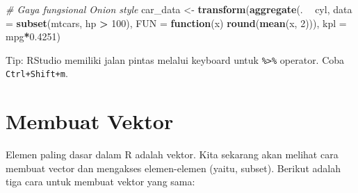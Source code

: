 \documentclass[
]{book}
\newenvironment{Shaded}{\begin{snugshade}}{\end{snugshade}}
\newcommand{\CommentTok}[1]{\textcolor[rgb]{0.56,0.35,0.01}{\textit{#1}}}
\newcommand{\ControlFlowTok}[1]{\textcolor[rgb]{0.13,0.29,0.53}{\textbf{#1}}}
\newcommand{\DataTypeTok}[1]{\textcolor[rgb]{0.13,0.29,0.53}{#1}}
\newcommand{\DecValTok}[1]{\textcolor[rgb]{0.00,0.00,0.81}{#1}}
\newcommand{\FloatTok}[1]{\textcolor[rgb]{0.00,0.00,0.81}{#1}}
\newcommand{\KeywordTok}[1]{\textcolor[rgb]{0.13,0.29,0.53}{\textbf{#1}}}
\newcommand{\NormalTok}[1]{#1}
\newcommand{\OperatorTok}[1]{\textcolor[rgb]{0.81,0.36,0.00}{\textbf{#1}}}
\newcommand{\StringTok}[1]{\textcolor[rgb]{0.31,0.60,0.02}{#1}}
\begin{document}
\begin{Shaded}
\begin{Highlighting}[]
\CommentTok{# Gaya fungsional Onion style}
\NormalTok{car_data <-}\StringTok{ }
\KeywordTok{transform}\NormalTok{(}\KeywordTok{aggregate}\NormalTok{(. }\OperatorTok{~}\StringTok{ }\NormalTok{cyl, }
                    \DataTypeTok{data =} \KeywordTok{subset}\NormalTok{(mtcars, hp }\OperatorTok{>}\StringTok{ }\DecValTok{100}\NormalTok{), }
                    \DataTypeTok{FUN =} \ControlFlowTok{function}\NormalTok{(x) }\KeywordTok{round}\NormalTok{(}\KeywordTok{mean}\NormalTok{(x, }\DecValTok{2}\NormalTok{))), }
                    \DataTypeTok{kpl =}\NormalTok{ mpg}\OperatorTok{*}\FloatTok{0.4251}\NormalTok{)}
\end{Highlighting}
\end{Shaded}

\begin{Shaded}
\end{Shaded}

Tip: RStudio memiliki jalan pintas melalui keyboard untuk \texttt{\%\textgreater{}\%} operator. Coba \texttt{Ctrl+Shift+m}.

\hypertarget{membuat-vektor}{%
\section{Membuat Vektor}\label{membuat-vektor}}

Elemen paling dasar dalam R adalah vektor. Kita sekarang akan melihat cara membuat vector dan mengakses elemen-elemen (yaitu, subset). Berikut adalah tiga cara untuk membuat vektor yang sama:
\end{document}
